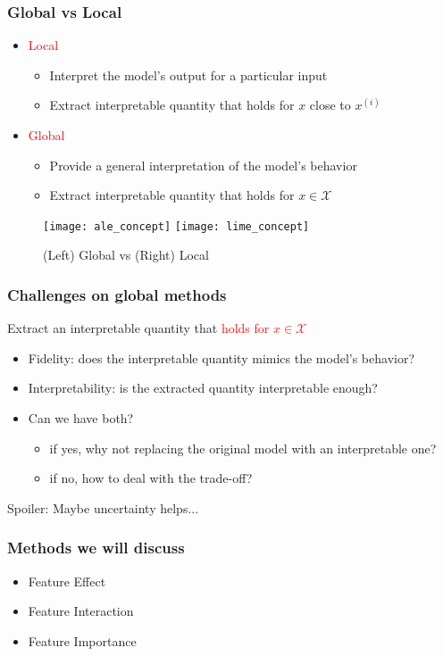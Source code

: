 \begin{frame}
  \frametitle{Global vs Local}
  \begin{itemize}
    \item \textcolor{red}{Local}
    \begin{itemize}
      \item Interpret the model's output for a particular input
      \item Extract interpretable quantity that holds for $x$ close to $x^{(i)}$
    \end{itemize}

    \item \textcolor{red}{Global}
    \begin{itemize}
      \item Provide a general interpretation of the model's behavior
      \item Extract interpretable quantity that holds for $x \in \mathcal{X}$
    \end{itemize}
  \end{itemize}

  \begin{figure}
    \centering
    \texttt{[image: ale\_concept]}
    \texttt{[image: lime\_concept]}
    \caption{(Left) Global vs (Right) Local}
  \end{figure}
\end{frame}


\begin{frame}
  \frametitle{Challenges on global methods}
  Extract an interpretable quantity that \textcolor{red}{holds for $x \in \mathcal{X}$}
  \begin{itemize}
    \item Fidelity: does the interpretable quantity mimics the model's behavior?
    \item Interpretability: is the extracted quantity interpretable enough?
    \item Can we have both?
    \begin{itemize}
      \item if yes, why not replacing the original model with an interpretable one?
      \item if no, how to deal with the trade-off?
    \end{itemize}
  \end{itemize}

  \noindent\makebox[\linewidth]{\rule{\paperwidth}{0.4pt}}
  Spoiler: Maybe uncertainty helps...
\end{frame}


\begin{frame}
  \frametitle{Methods we will discuss}

  \begin{itemize}
    \item Feature Effect
    \item Feature Interaction
    \item Feature Importance
  \end{itemize}

\end{frame}
